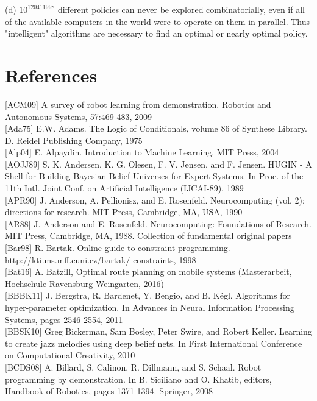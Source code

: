 \documentclass[10pt]{article}
\begin{document}
(d) $10^{120411998}$ different policies can never be explored combinatorially, even if all of the available computers in the world were to operate on them in parallel. Thus "intelligent" algorithms are necessary to find an optimal or nearly optimal policy.

\section*{References}
[ACM09] A survey of robot learning from demonstration. Robotics and Autonomous Systems, 57:469-483, 2009\\[0pt]
[Ada75] E.W. Adams. The Logic of Conditionals, volume 86 of Synthese Library. D. Reidel Publishing Company, 1975\\[0pt]
[Alp04] E. Alpaydin. Introduction to Machine Learning. MIT Press, 2004\\[0pt]
[AOJJ89] S. K. Andersen, K. G. Olesen, F. V. Jensen, and F. Jensen. HUGIN - A Shell for Building Bayesian Belief Universes for Expert Systems. In Proc. of the 11th Intl. Joint Conf. on Artificial Intelligence (IJCAI-89), 1989\\[0pt]
[APR90] J. Anderson, A. Pellionisz, and E. Rosenfeld. Neurocomputing (vol. 2): directions for research. MIT Press, Cambridge, MA, USA, 1990\\[0pt]
[AR88] J. Anderson and E. Rosenfeld. Neurocomputing: Foundations of Research. MIT Press, Cambridge, MA, 1988. Collection of fundamental original papers\\[0pt]
[Bar98] R. Bartak. Online guide to constraint programming. \href{http://kti.ms.mff.cuni.cz/bartak/}{http://kti.ms.mff.cuni.cz/bartak/} constraints, 1998\\[0pt]
[Bat16] A. Batzill, Optimal route planning on mobile systems (Masterarbeit, Hochschule Ravensburg-Weingarten, 2016)\\[0pt]
[BBBK11] J. Bergstra, R. Bardenet, Y. Bengio, and B. Kégl. Algorithms for hyper-parameter optimization. In Advances in Neural Information Processing Systems, pages 2546-2554, 2011\\[0pt]
[BBSK10] Greg Bickerman, Sam Bosley, Peter Swire, and Robert Keller. Learning to create jazz melodies using deep belief nets. In First International Conference on Computational Creativity, 2010\\[0pt]
[BCDS08] A. Billard, S. Calinon, R. Dillmann, and S. Schaal. Robot programming by demonstration. In B. Siciliano and O. Khatib, editors, Handbook of Robotics, pages 1371-1394. Springer, 2008\\[0pt]
\end{document}
